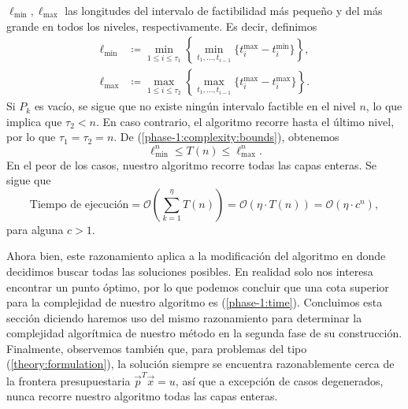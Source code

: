 $\ell_{\min}, \ell_{\max}$ las longitudes del intervalo de factibilidad más pequeño y del más grande
en todos los niveles, respectivamente. Es decir, definimos
\begin{align}
	\ell_{\min} &\coloneq \min_{1 \leq i \leq \tau_1} \left\lbrace \min_{t_1, \ldots, t_{i - 1}} \lbrace
	t_i^{\max} - t_i^{\min} \rbrace \right\rbrace,
	\\
	\ell_{\max} &\coloneq \max_{1 \leq i \leq \tau_2} \left\lbrace \max_{t_1, \ldots, t_{i - 1}} \lbrace
	t_i^{\max} - t_i^{\max} \rbrace \right\rbrace.
\end{align}
Si $P_k$ es vacío, se sigue que no existe ningún intervalo factible en el nivel $n$, lo que implica
que $\tau_2 < n$. En caso contrario, el algoritmo recorre hasta el último nivel, por lo que $\tau_1
= \tau_2 = n$. De (\ref{phase-1:complexity:bounds}), obtenemos
\begin{equation}
	\ell_{\min}^{n} \leq T(n) \leq \ell_{\max}^{n}.
\end{equation}
En el peor de los casos, nuestro algoritmo recorre todas las capas enteras. Se sigue que
\begin{equation}
	\label{phase-1:time}
	\text{Tiempo de ejecución}
	= \mathcal{O} \left(\sum_{k=1}^{\eta} T(n) \right)
	= \mathcal{O}(\eta \cdot T(n))
	= \mathcal{O}(\eta \cdot c^{n}),
\end{equation}
para alguna $c > 1$.

Ahora bien, este razonamiento aplica a la modificación del algoritmo en donde decidimos buscar todas
las soluciones posibles. En realidad solo nos interesa encontrar un punto óptimo, por lo que podemos
concluir que una cota superior para la complejidad de nuestro algoritmo es (\ref{phase-1:time}).
Concluimos esta sección diciendo haremos uso del mismo razonamiento para determinar la complejidad
algorítmica de nuestro método en la segunda fase de su construcción. Finalmente, observemos también
que, para problemas del tipo (\ref{theory:formulation}), la solución siempre se encuentra
razonablemente cerca de la frontera presupuestaria $\vec{p}^T\vec{x} = u$, así que a excepción de
casos degenerados, nunca recorre nuestro algoritmo todas las capas enteras.
